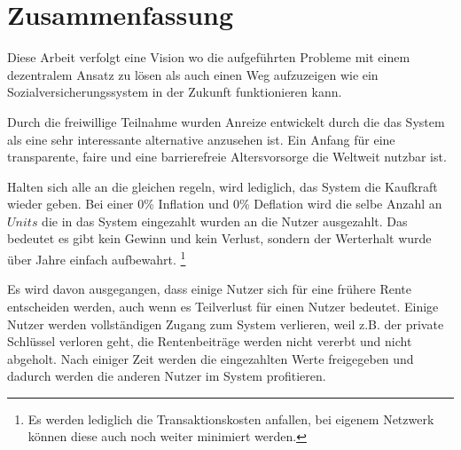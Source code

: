 \section{Zusammenfassung}

Diese Arbeit verfolgt eine Vision wo die aufgeführten Probleme mit einem dezentralem Ansatz zu lösen als auch einen Weg aufzuzeigen wie ein Sozialversicherungssystem in der Zukunft funktionieren kann. 

Durch die freiwillige Teilnahme wurden Anreize entwickelt durch die das System als eine sehr interessante alternative anzusehen ist. Ein Anfang für eine transparente, faire und eine barrierefreie Altersvorsorge die Weltweit nutzbar ist.




Halten sich alle an die gleichen regeln, wird lediglich, das System die Kaufkraft wieder geben. Bei einer 0\% Inflation und 0\% Deflation wird die selbe Anzahl an $Units$ die in das System eingezahlt wurden an die Nutzer ausgezahlt. Das bedeutet es gibt kein Gewinn und kein Verlust, sondern der Werterhalt wurde über Jahre einfach aufbewahrt. \footnote{ Es werden lediglich die Transaktionskosten anfallen, bei eigenem Netzwerk können diese auch noch weiter minimiert werden.}

Es wird davon ausgegangen, dass einige Nutzer sich für eine frühere Rente entscheiden werden, auch wenn es Teilverlust für einen Nutzer bedeutet. Einige Nutzer werden vollständigen Zugang zum System verlieren, weil z.B. der private Schlüssel verloren geht, die Rentenbeiträge werden nicht vererbt und nicht abgeholt. Nach einiger Zeit werden die eingezahlten Werte freigegeben und dadurch werden die anderen Nutzer im System profitieren.



